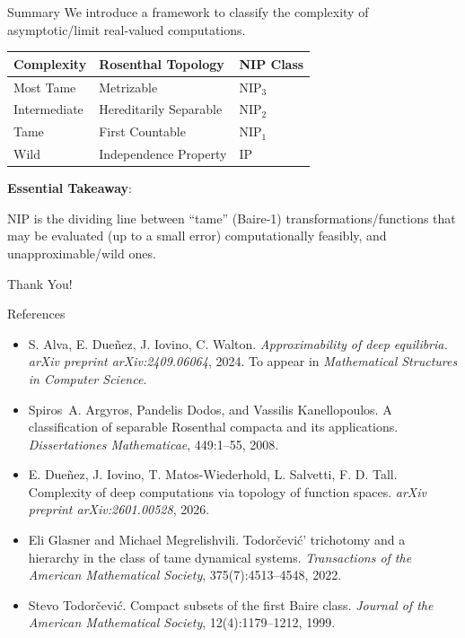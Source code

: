 \documentclass{beamer}
\newcommand{\NIP}{\text{NIP}}
\begin{document}
\begin{frame}{Summary}
    We introduce a framework to classify the complexity of asymptotic/limit real-valued computations.

    \vspace{0.5cm}
    
    \begin{table}[]
    \centering
    \begin{tabular}{@{}lll@{}}
    \toprule
    \textbf{Complexity} & \textbf{Rosenthal Topology} & \textbf{NIP Class} \\ \midrule
    Most Tame & Metrizable & $\NIP_3$ \\
    Intermediate & Hereditarily Separable & $\NIP_2$ \\
    Tame & First Countable & $\NIP_1$ \\
    Wild & Independence Property & IP \\ \bottomrule
    \end{tabular}
    \end{table}

    \vspace{0.2cm}
    \textbf{Essential Takeaway}:

    \alert{NIP} is the \alert{dividing line} between \alert{“tame” (Baire-1)} transformations/functions that may be evaluated (up to a small error) \alert{computationally feasibly}, and \alert{unapproximable/wild} ones.
\end{frame}

\begin{frame}
    \centering
    \Huge Thank You!
\end{frame}

\begin{frame}{References}
  \begin{itemize}
  \item
  S. Alva, E. Dueñez, J. Iovino, C. Walton.
  \emph{Approximability of deep equilibria.}
  {\em arXiv preprint arXiv:2409.06064}, 2024.
  To appear in \emph{Mathematical Structures in Computer Science}.

\item
Spiros~A. Argyros, Pandelis Dodos, and Vassilis Kanellopoulos.
A classification of separable {Rosenthal} compacta and its applications.
{\em Dissertationes Mathematicae}, 449:1--55, 2008.

\item
  E. Dueñez, J. Iovino, T. Matos-Wiederhold, L. Salvetti, F. D. Tall.
  {Complexity of deep computations via topology of function spaces.}
  {\em arXiv preprint arXiv:2601.00528}, 2026.

\item Eli Glasner and Michael Megrelishvili.
 {Todorčević'} trichotomy and a hierarchy in the class of tame dynamical systems.
 {\em Transactions of the American Mathematical Society},
  375(7):4513--4548, 2022.

\item
  Stevo Todorčević.
  Compact subsets of the first {Baire} class.
  {\em Journal of the American Mathematical Society}, 12(4):1179--1212,
  1999.

  \end{itemize}
\end{frame}
\end{document}
